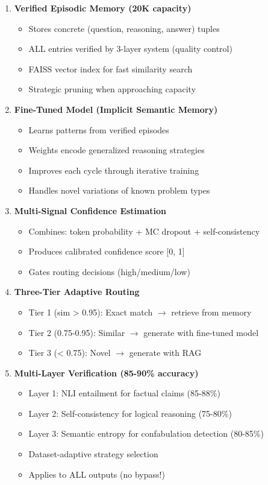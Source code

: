 \documentclass[12pt,a4paper]{article}
\theoremstyle{definition}
\begin{document}
\begin{enumerate}
    \item \textbf{Verified Episodic Memory (20K capacity)}
    \begin{itemize}
        \item Stores concrete (question, reasoning, answer) tuples
        \item ALL entries verified by 3-layer system (quality control)
        \item FAISS vector index for fast similarity search
        \item Strategic pruning when approaching capacity
    \end{itemize}
    
    \item \textbf{Fine-Tuned Model (Implicit Semantic Memory)}
    \begin{itemize}
        \item Learns patterns from verified episodes
        \item Weights encode generalized reasoning strategies
        \item Improves each cycle through iterative training
        \item Handles novel variations of known problem types
    \end{itemize}
    
    \item \textbf{Multi-Signal Confidence Estimation}
    \begin{itemize}
        \item Combines: token probability + MC dropout + self-consistency
        \item Produces calibrated confidence score [0, 1]
        \item Gates routing decisions (high/medium/low)
    \end{itemize}
    
    \item \textbf{Three-Tier Adaptive Routing}
    \begin{itemize}
        \item Tier 1 (sim > 0.95): Exact match $\rightarrow$ retrieve from memory
        \item Tier 2 (0.75-0.95): Similar $\rightarrow$ generate with fine-tuned model
        \item Tier 3 (< 0.75): Novel $\rightarrow$ generate with RAG
    \end{itemize}
    
    \item \textbf{Multi-Layer Verification (85-90\% accuracy)}
    \begin{itemize}
        \item Layer 1: NLI entailment for factual claims (85-88\%)
        \item Layer 2: Self-consistency for logical reasoning (75-80\%)
        \item Layer 3: Semantic entropy for confabulation detection (80-85\%)
        \item Dataset-adaptive strategy selection
        \item Applies to ALL outputs (no bypass!)
    \end{itemize}
    

\end{enumerate}
\end{document}
